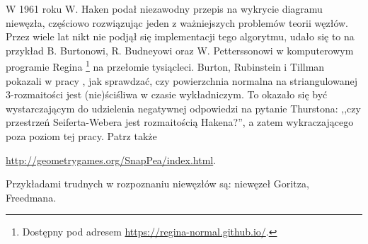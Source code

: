 W 1961 roku W. Haken \cite{haken61} podał niezawodny przepis na wykrycie diagramu niewęzła,
częściowo rozwiązując jeden z ważniejszych problemów teorii węzłów.
Przez wiele lat nikt nie podjął się implementacji tego algorytmu,
udało się to na przykład B. Burtonowi, R. Budneyowi oraz W. Petterssonowi w komputerowym programie Regina
\footnote{Dostępny pod adresem \url{https://regina-normal.github.io/}.} na przełomie tysiącleci.
Burton, Rubinstein i Tillman pokazali w pracy \cite{burton12}, jak sprawdzać,
czy powierzchnia normalna na striangulowanej 3-rozmaitości jest (nie)ściśliwa w czasie wykładniczym.
To okazało się być wystarczającym do udzielenia negatywnej odpowiedzi na pytanie Thurstona:
,,czy przestrzeń Seiferta-Webera jest rozmaitością Hakena?'',
a zatem wykraczającego poza poziom tej pracy.
Patrz także {\url{http://geometrygames.org/SnapPea/index.html}.

Przykładami trudnych w rozpoznaniu niewęzłów są: niewęzeł Goritza, Freedmana.

}
